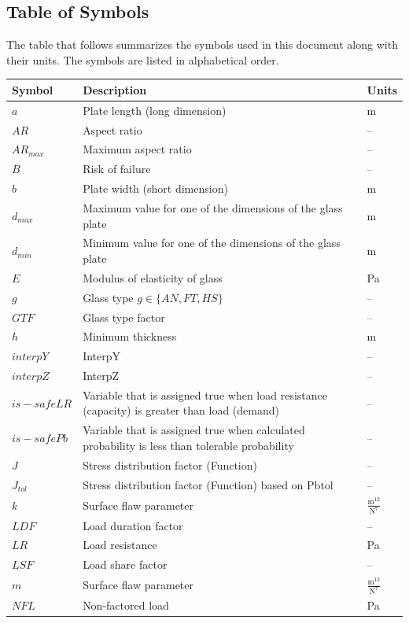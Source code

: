 \documentclass[12pt]{article}
\begin{document}
\subsection{Table of Symbols}
\label{Sec:ToS}
The table that follows summarizes the symbols used in this document along with their units. The symbols are listed in alphabetical order.
\begin{longtabu}{l X[l] l}
\toprule
Symbol & Description & Units
\\
\midrule
\endhead
$a$ & Plate length (long dimension) & m
\\
$AR$ & Aspect ratio & --
\\
${AR_{max}}$ & Maximum aspect ratio & --
\\
$B$ & Risk of failure & --
\\
$b$ & Plate width (short dimension) & m
\\
${d_{max}}$ & Maximum value for one of the dimensions of the glass plate & m
\\
${d_{min}}$ & Minimum value for one of the dimensions of the glass plate & m
\\
$E$ & Modulus of elasticity of glass & Pa
\\
$g$ & Glass type $g\in{}\{AN,FT,HS\}$ & --
\\
$GTF$ & Glass type factor & --
\\
$h$ & Minimum thickness & m
\\
$interpY$ & InterpY & --
\\
$interpZ$ & InterpZ & --
\\
$is-safeLR$ & Variable that is assigned true when load resistance (capacity) is greater than load (demand) & --
\\
$is-safePb$ & Variable that is assigned true when calculated probability is less than tolerable probability & --
\\
$J$ & Stress distribution factor (Function) & --
\\
${J_{tol}}$ & Stress distribution factor (Function) based on Pbtol & --
\\
$k$ & Surface flaw parameter & $\frac{\text{m}^{12}}{\text{N}^{7}}$
\\
$LDF$ & Load duration factor & --
\\
$LR$ & Load resistance & Pa
\\
$LSF$ & Load share factor & --
\\
$m$ & Surface flaw parameter & $\frac{\text{m}^{12}}{\text{N}^{7}}$
\\
$NFL$ & Non-factored load & Pa
\\

\end{longtabu}
\end{document}
